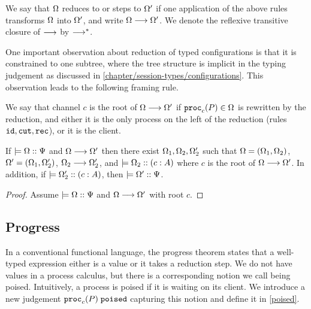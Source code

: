 We say that $\Omega$ reduces to or steps to $\Omega'$ if one application of the above rules transforms $\Omega$ into $\Omega'$, and write $\Omega \longrightarrow \Omega'$. We denote the reflexive transitive closure of $\longrightarrow$ by $\longrightarrow^*$.

One important observation about reduction of typed configurations is that it is constrained to one subtree, where the tree structure is implicit in the typing judgement as discussed in \cref{chapter/session-types/configurations}. This observation leads to the following framing rule.

\begin{definition} We say that channel $c$ is the root of $\Omega \longrightarrow \Omega'$ if $\mathtt{proc}_{c}(P) \in \Omega$ is rewritten by the reduction, and either it is the only process on the left of the reduction (rules $\texttt{id}, \texttt{cut}, \texttt{rec}$), or it is the client. 
\end{definition}

\begin{lemma}[Framing]
  \label{framing}
  If $\models {\Omega} :: {\Psi}$ and $\Omega \longrightarrow \Omega'$ then there exist $\Omega_1, \Omega_2, \Omega_2'$ such that $\Omega = (\Omega_1, \Omega_2)$, $\Omega' = (\Omega_1, \Omega_2')$, $\Omega_2 \longrightarrow \Omega_2'$, and $\models {\Omega_2} :: ({c} : {A})$ where $c$ is the root of $\Omega \longrightarrow \Omega'$. In addition, if $\models {\Omega_2'} :: ({c} : {A})$, then $\models {\Omega'} :: {\Psi}$.
\end{lemma}

\begin{proof}
  Assume $\models {\Omega} :: {\Psi}$ and $\Omega \longrightarrow \Omega'$ with root $c$. 
\end{proof}


\subsection{Progress}

In a conventional functional language, the progress theorem states that a well-typed expression either is a value or it takes a reduction step. We do not have values in a process calculus, but there is a corresponding notion we call being poised. Intuitively, a process is poised if it is waiting on its client. We introduce a new judgement $\mathtt{proc}_{c}(P)\;\mathtt{poised}$ capturing this notion and define it in \cref{poised}.

